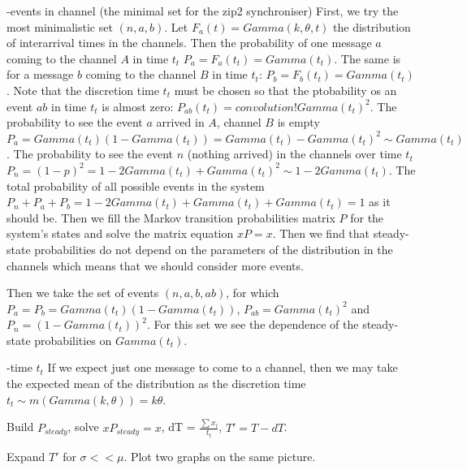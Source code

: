 -events in channel (the minimal set for the zip2 synchroniser)
First, we try the most minimalistic set $(n,a,b)$. Let $F_{a}(t) = Gamma(k, \theta, t)$ the distribution of interarrival times in the channels. Then the probability of one message $a$ coming to the channel $A$ in time $t_{t}$ $P_{a} = F_{a}(t_{t}) = Gamma(t_{t})$. The same is for a message $b$ coming to the channel $B$ in time $t_{t}$: $P_{b} = F_{b}(t_{t}) = Gamma(t_{t})$. Note that the discretion time $t_{t}$ must be chosen so that the ptobability os an event $ab$ in time $t_{t}$ is almost zero: $P_{ab}(t_{t}) = convolution! Gamma(t_{t})^2$. The probability to see the event $a$ arrived in $A$, channel $B$ is empty $P_{a} = Gamma(t_{t})(1-Gamma(t_{t})) = Gamma(t_{t}) - Gamma(t_{t})^2 \sim Gamma(t_{t})$. The probability to see the event $n$ (nothing arrived) in the channels over time $t_{t}$ $P_{n} = (1-p)^2 = 1 - 2 Gamma(t_{t}) + Gamma(t_{t})^2 \sim 1 - 2 Gamma(t_{t})$. The total probability of all possible events in the system $P_{n} + P_{a} + P_{b} = 1 - 2 Gamma(t_{t}) + Gamma(t_{t}) + Gamma(t_{t}) = 1$ as it should be. Then we fill the Markov transition probabilities matrix $P$ for the system's states and solve the matrix equation $xP = x$. Then we find that steady-state probabilities do not depend on the parameters of the distribution in the channels which means that we should consider more events.

Then we take the set of events $(n,a,b,ab)$, for which $P_{a} = P_{b} = Gamma(t_{t})(1 - Gamma(t_{t}))$, $P_{ab} = Gamma(t_{t})^2$ and $P_{n} = (1 - Gamma(t_{t}))^2$. For this set we see the dependence of the steady-state probabilities on $Gamma(t_{t})$.

-time $t_t$
If we expect just one message to come to a channel, then we may take the expected mean of the distribution as the discretion time $t_{t} \sim m(Gamma(k,\theta)) = k \theta$.


Build $P_{steady}$, solve $x P_{steady} = x$, dT = $\frac{\sum{x_l}}{t_t}$, $T' = T - dT$.

Expand $T'$ for $\sigma << \mu$. Plot two graphs on the same picture.
